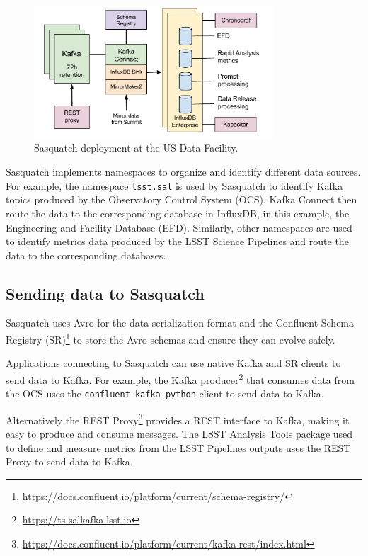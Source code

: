 \begin{figure}[h]
    \centering
    \includegraphics[width=0.8\textwidth]{figures/sasquatch-architecture.pdf}
    \caption{Sasquatch deployment at the US Data Facility.}
    \label{fig:system-architecture}

\end{figure}

Sasquatch implements namespaces to organize and identify different data sources. For example, the namespace \texttt{lsst.sal} is used by Sasquatch to identify Kafka topics produced by the Observatory Control System (OCS). Kafka Connect then route the data to the corresponding database in InfluxDB, in this example, the Engineering and Facility Database (EFD). Similarly, other namespaces are used to identify metrics data produced by the LSST Science Pipelines and route the data to the corresponding databases.

\subsection{Sending data to Sasquatch}

Sasquatch uses Avro for the data serialization format and the Confluent Schema Registry (SR)\footnote{\url{https://docs.confluent.io/platform/current/schema-registry/}} to store the Avro schemas and ensure they can evolve safely.

Applications connecting to Sasquatch can use native Kafka and SR clients to send data to Kafka. For example, the Kafka producer\footnote{\url{https://ts-salkafka.lsst.io}} that consumes data from the OCS uses the \texttt{confluent-kafka-python} client to send data to Kafka.

Alternatively the REST Proxy\footnote{\url{https://docs.confluent.io/platform/current/kafka-rest/index.html}} provides a REST interface to Kafka, making it easy to produce and consume messages. The LSST Analysis Tools package used to define and measure metrics from the LSST Pipelines outputs uses the REST Proxy to send data to Kafka.

